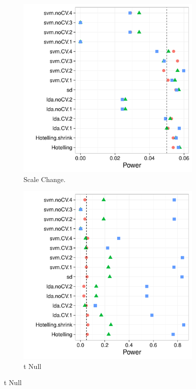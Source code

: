 \documentclass[12pt,a4paper]{article}
\begin{document}
\begin{figure}[h]
\centering
\caption{\footnotesize [TODO].}	
	\begin{subfigure}{.5\textwidth}
	  \centering
	  \includegraphics[width=1\linewidth]{"art/2016-07-30 10:33:05"}
	  \caption{Scale Change.}  %
	\label{fig:scale_change}
	\end{subfigure}%
	\begin{subfigure}{.5\textwidth}
	  \centering
	  \includegraphics[width=1\linewidth]{"art/2016-08-04 19:32:17"}
	  \caption{t Null} %
	\label{fig:t_null}
	\end{subfigure}
\end{figure}
\end{document}
